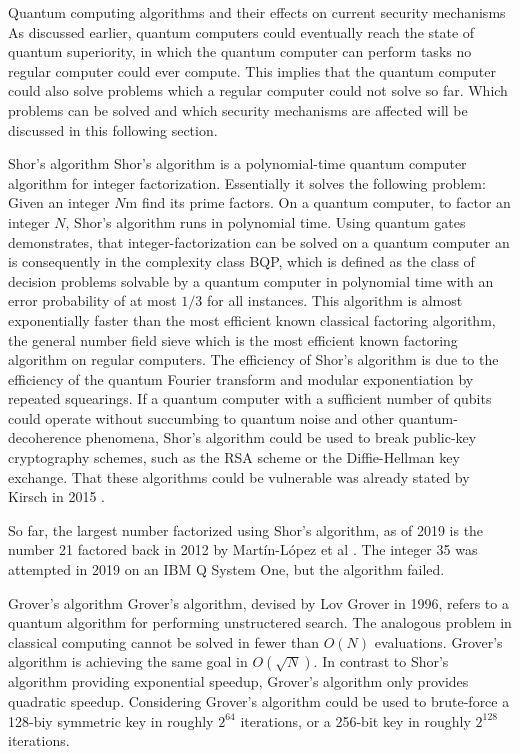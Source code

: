 \documentclass[aps,preprintnumbers,twocolumn]{revtex4}
\begin{document}
\begin{section}{Quantum computing algorithms and their effects on current security mechanisms}
As discussed earlier, quantum computers could eventually reach the state of quantum superiority, 
in which the quantum computer can perform tasks no regular computer could ever compute.
This implies that the quantum computer could also solve problems which a regular computer could not solve so far.
Which problems can be solved and which security mechanisms are affected will be discussed in this following section. 

\begin{subsection}{Shor's algorithm}
Shor's algorithm is a polynomial-time quantum computer algorithm for integer factorization.
Essentially it solves the following problem: 
Given an integer $N$m find its prime factors. 
On a quantum computer, to factor an integer $N$, 
Shor's algorithm runs in polynomial time. 
Using quantum gates demonstrates, 
that integer-factorization can be solved on a quantum computer an is consequently in the complexity class BQP, 
which is defined as the class of decision problems solvable by a quantum computer in polynomial time with an error probability of at most $1/3$ for all instances. 
This algorithm is almost exponentially faster than the most efficient known classical factoring algorithm, the general number field sieve which is the most efficient known factoring algorithm on regular computers. 
The efficiency of Shor's algorithm is due to the efficiency of the quantum Fourier transform and modular exponentiation by repeated squearings. 
If a quantum computer with a sufficient number of qubits could operate without succumbing to quantum noise and other quantum-decoherence phenomena, 
Shor's algorithm could be used to break public-key cryptography schemes, 
such as the RSA scheme or the Diffie-Hellman key exchange. That these algorithms could be vulnerable was already stated by Kirsch in 2015
\cite{Kirsch2015QuantumCT}.

So far, the largest number factorized using Shor's algorithm, 
as of 2019 is the number 21 factored back in 2012 by Martín-López et al \cite{article}. 
The integer 35 was attempted in 2019 on an IBM Q System One, 
but the algorithm failed. 

\end{subsection}

\begin{subsection}{Grover's algorithm}
Grover's algorithm, devised by Lov Grover in 1996,
refers to a quantum algorithm for performing unstructered search. 
The analogous problem in classical computing cannot be solved in fewer than $O(N)$ evaluations. 
Grover's algorithm is achieving the same goal in $O(\sqrt{N})$. 
In contrast to Shor's algorithm providing exponential speedup, 
Grover's algorithm only provides quadratic speedup. 
Considering Grover's algorithm could be used to brute-force a 128-biy symmetric key in roughly $2^{64}$ iterations, 
or a 256-bit key in roughly $2^{128}$ iterations.


\end{subsection}
\end{section}
\end{document}
